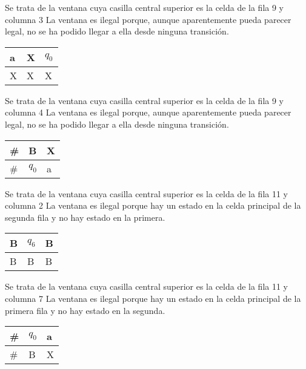 ﻿\documentclass[a4paper,10pt]{article}
\begin{document}
Se trata de la ventana cuya casilla central superior es la celda de la fila 9 y columna 3\newline
La ventana es ilegal porque, aunque aparentemente pueda parecer legal, no se ha podido llegar a ella desde ninguna transición.\newline
\begin{table}[h!]
\centering
\begin{tabular}{|l|l|l|}
\hline
	a   &   X   &   $q_0$	\\ \hline
	X   &   X   &   X	\\ \hline
\end{tabular}
\end{table}

Se trata de la ventana cuya casilla central superior es la celda de la fila 9 y columna 4\newline
La ventana es ilegal porque, aunque aparentemente pueda parecer legal, no se ha podido llegar a ella desde ninguna transición.\newline
\begin{table}[h!]
\centering
\begin{tabular}{|l|l|l|}
\hline
	\#  &   B   &   X	\\ \hline
	\#  &   $q_0$  &   a	\\ \hline
\end{tabular}
\end{table}

Se trata de la ventana cuya casilla central superior es la celda de la fila 11 y columna 2\newline
La ventana es ilegal porque hay un estado en la celda principal de la segunda fila y no hay estado en la primera.\newline
\begin{table}[h!]
\centering
\begin{tabular}{|l|l|l|}
\hline
	B   &   $q_6$  &   B	\\ \hline
	B   &   B   &   B	\\ \hline
\end{tabular}
\end{table}

Se trata de la ventana cuya casilla central superior es la celda de la fila 11 y columna 7\newline
La ventana es ilegal porque hay un estado en la celda principal de la primera fila y no hay estado en la segunda.\newline
\begin{table}[h!]
\centering
\begin{tabular}{|l|l|l|}
\hline
	\#  &   $q_0$  &   a	\\ \hline
	\#  &   B   &   X	\\ \hline
\end{tabular}
\end{table}
\end{document}
